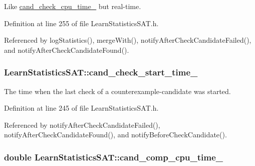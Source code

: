 Like \hyperlink{classLearnStatisticsSAT_a2ab5cd522b7a4d700a11c0bb430baa81}{cand\-\_\-check\-\_\-cpu\-\_\-time\-\_\-} but real-\/time. 



Definition at line 255 of file Learn\-Statistics\-S\-A\-T.\-h.



Referenced by log\-Statistics(), merge\-With(), notify\-After\-Check\-Candidate\-Failed(), and notify\-After\-Check\-Candidate\-Found().

\hypertarget{classLearnStatisticsSAT_a1effa4c15e4349fb1e6f62ad6c79d6c5}{
\subsubsection[{cand\-\_\-check\-\_\-start\-\_\-time\-\_\-}]{ Learn\-Statistics\-S\-A\-T\-::cand\-\_\-check\-\_\-start\-\_\-time\-\_\-\hspace{0.3cm}{\ttfamily [protected]}}}\label{classLearnStatisticsSAT_a1effa4c15e4349fb1e6f62ad6c79d6c5}


The time when the last check of a counterexample-\/candidate was started. 



Definition at line 245 of file Learn\-Statistics\-S\-A\-T.\-h.



Referenced by notify\-After\-Check\-Candidate\-Failed(), notify\-After\-Check\-Candidate\-Found(), and notify\-Before\-Check\-Candidate().

\hypertarget{classLearnStatisticsSAT_af977c00fbf0f9978f92dd5c997577a06}{
\subsubsection[{cand\-\_\-comp\-\_\-cpu\-\_\-time\-\_\-}]{\setlength{\rightskip}{0pt plus 5cm}double Learn\-Statistics\-S\-A\-T\-::cand\-\_\-comp\-\_\-cpu\-\_\-time\-\_\-\hspace{0.3cm}{\ttfamily [protected]}}}\label{classLearnStatisticsSAT_af977c00fbf0f9978f92dd5c997577a06}


